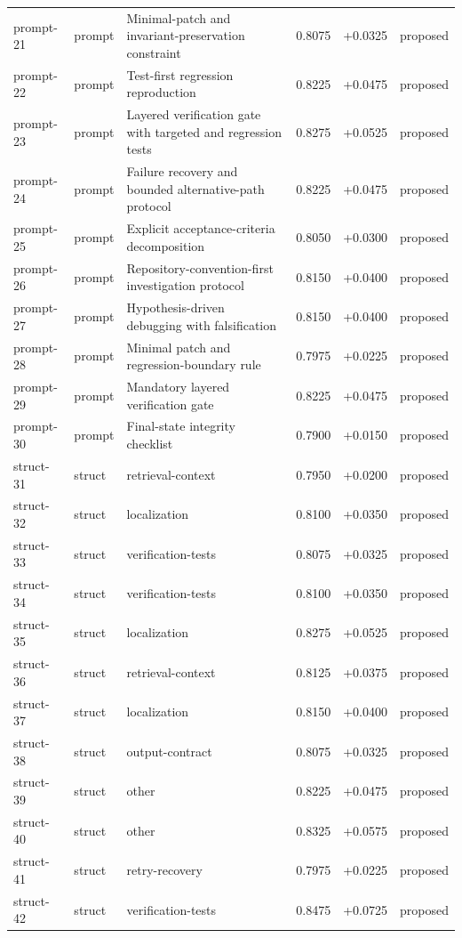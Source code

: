 \begin{center}
\begin{longtable}{llp{5.2cm}rrl}
prompt-21 & prompt & Minimal-patch and invariant-preservation constraint & 0.8075 & +0.0325 & proposed \\
prompt-22 & prompt & Test-first regression reproduction & 0.8225 & +0.0475 & proposed \\
prompt-23 & prompt & Layered verification gate with targeted and regression tests & 0.8275 & +0.0525 & proposed \\
prompt-24 & prompt & Failure recovery and bounded alternative-path protocol & 0.8225 & +0.0475 & proposed \\
prompt-25 & prompt & Explicit acceptance-criteria decomposition & 0.8050 & +0.0300 & proposed \\
prompt-26 & prompt & Repository-convention-first investigation protocol & 0.8150 & +0.0400 & proposed \\
prompt-27 & prompt & Hypothesis-driven debugging with falsification & 0.8150 & +0.0400 & proposed \\
prompt-28 & prompt & Minimal patch and regression-boundary rule & 0.7975 & +0.0225 & proposed \\
prompt-29 & prompt & Mandatory layered verification gate & 0.8225 & +0.0475 & proposed \\
prompt-30 & prompt & Final-state integrity checklist & 0.7900 & +0.0150 & proposed \\
struct-31 & struct & retrieval-context & 0.7950 & +0.0200 & proposed \\
struct-32 & struct & localization & 0.8100 & +0.0350 & proposed \\
struct-33 & struct & verification-tests & 0.8075 & +0.0325 & proposed \\
struct-34 & struct & verification-tests & 0.8100 & +0.0350 & proposed \\
struct-35 & struct & localization & 0.8275 & +0.0525 & proposed \\
struct-36 & struct & retrieval-context & 0.8125 & +0.0375 & proposed \\
struct-37 & struct & localization & 0.8150 & +0.0400 & proposed \\
struct-38 & struct & output-contract & 0.8075 & +0.0325 & proposed \\
struct-39 & struct & other & 0.8225 & +0.0475 & proposed \\
struct-40 & struct & other & 0.8325 & +0.0575 & proposed \\
struct-41 & struct & retry-recovery & 0.7975 & +0.0225 & proposed \\
struct-42 & struct & verification-tests & 0.8475 & +0.0725 & proposed \\

\end{longtable}
\end{center}
